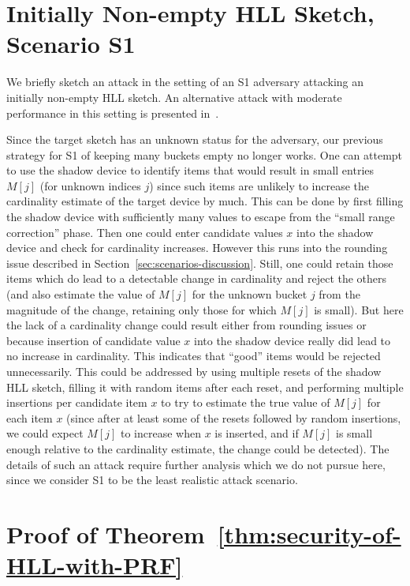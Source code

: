 \documentclass{article}
\begin{document}



\appendix

\section{Initially Non-empty HLL Sketch, Scenario S1}\label{sec:non-empty-HLL-sketch-S1} 

We briefly sketch an attack in the setting of an S1 adversary attacking an initially non-empty HLL sketch. An alternative attack with moderate performance in this setting is presented in~\cite{hllvuln}.

Since the target sketch has an unknown status for the adversary, our previous strategy for S1 of keeping many buckets empty no longer works. One can attempt to use the shadow device to identify items that would result in small entries $M[j]$ (for unknown indices $j$) since such items are unlikely to increase the cardinality estimate of the target device by much.  This can be done by first filling the shadow device with sufficiently many values to escape from the ``small range correction'' phase. Then one could enter candidate values $x$ into the shadow device and check for cardinality increases. However this runs into the rounding issue described in Section~\ref{sec:scenarios-discussion}. Still, one could retain those items which do lead to a detectable change in cardinality and reject the others (and also estimate the value of $M[j]$ for the unknown bucket $j$ from the magnitude of the change, retaining only those for which $M[j]$ is small). But here the lack of a cardinality change could result either from rounding issues or because insertion of candidate value $x$ into the shadow device really did lead to no increase in cardinality. This indicates that  ``good'' items would be rejected unnecessarily. This could be addressed by using multiple resets of the shadow HLL sketch, filling it with random items after each reset, and performing multiple insertions per candidate item $x$ to try to estimate the true value of $M[j]$ for each item $x$ (since after at least some of the resets followed by random insertions, we could expect $M[j]$ to increase when $x$ is inserted, and if $M[j]$ is small enough relative to the cardinality estimate, the change could be detected). The details of such an attack require further analysis which we do not pursue here, since we consider S1 to be the least realistic attack scenario. 

\section{Proof of Theorem~\ref{thm:security-of-HLL-with-PRF}}\label{sec:proof} 
\end{document}
